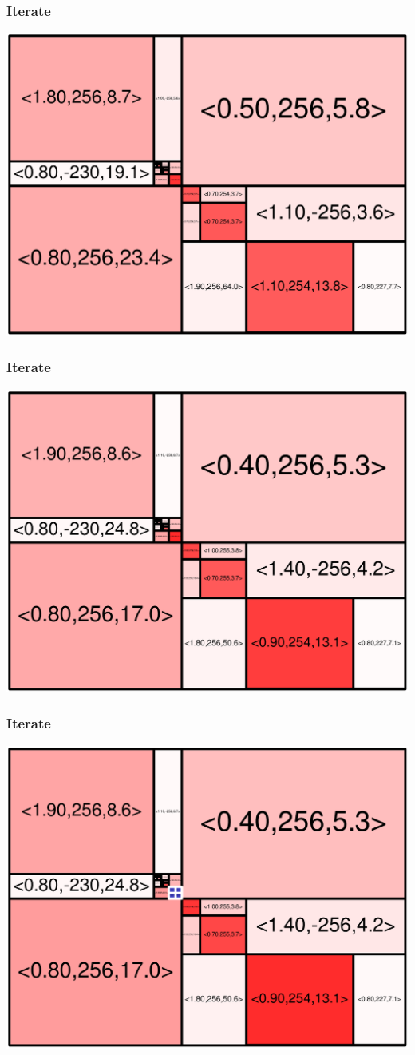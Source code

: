 \begin{frame}
\frametitle{Iterate}\begin{centering}\includegraphics[width=8.5 cm]{remy-graph/graph/test27.pdf}

\end{centering}\end{frame}


\begin{frame}
\frametitle{Iterate}\begin{centering}\includegraphics[width=8.5 cm]{remy-graph/graph/test28.pdf}

\end{centering}\end{frame}


\begin{frame}
\frametitle{Iterate}\begin{centering}\includegraphics[width=8.5 cm]{remy-graph/graph/test29.pdf}

\end{centering}\end{frame}


